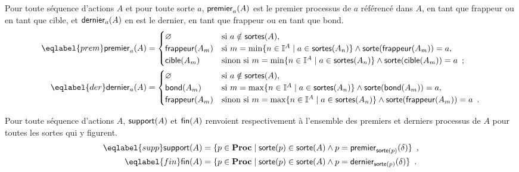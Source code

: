 \begin{definition}
  Pour toute séquence d'actions $A$ et pour toute sorte $a$,
  $\mathsf{premier}_{a}(A)$ est le premier processus de $a$ référencé dans $A$,
  en tant que frappeur ou en tant que cible,
  et $\mathsf{dernier}_{a}(A)$ en est le dernier,
  en tant que frappeur ou en tant que bond.
  \begin{align}
  \eqlabel{prem}
    \prem{a}{A} &=
      \begin{cases}
        \varnothing & \text{si } a \notin \sortes{A}, \\
        \hitter{A_m} & \text{si } m = \min\{ n \in \indexes{A} \mid a \in \sortes{A_n} \}
          \wedge \sorte{\hitter{A_m}} = a, \\
        \target{A_m} & \text{sinon si } m = \min\{ n \in \indexes{A} \mid a \in \sortes{A_n} \}
          \wedge \sorte{\target{A_m}} = a \enspace;
      \end{cases} \\
  \eqlabel{der}
    \der{a}{A} &=
      \begin{cases}
        \varnothing & \text{si } a \notin \sortes{A}, \\
        \bounce{A_m} & \text{si } m = \max\{ n \in \indexes{A} \mid a \in \sortes{A_n} \}
          \wedge \sorte{\bounce{A_m}} = a, \\
        \hitter{A_m} & \text{sinon si } m = \max\{ n \in \indexes{A} \mid a \in \sortes{A_n} \}
          \wedge \sorte{\hitter{A_m}} = a \enspace.
      \end{cases}
  \end{align}

  Pour toute séquence d'actions $A$,
  $\mathsf{support}(A)$ et $\mathsf{fin}(A)$ renvoient respectivement à l'ensemble des premiers
  et derniers processus de $A$ pour toutes les sortes qui y figurent.
  \begin{align}
  \eqlabel{supp}
    \supp{A} &= \{ p \in \Proc \mid \sorte{p} \in \sorte{A} \wedge
      p = \prem{\sort{p}}{\delta} \} \enspace, \\
  \eqlabel{fin}
    \fin{A} &= \{ p \in \Proc \mid \sorte{p} \in \sorte{A} \wedge
      p = \der{\sort{p}}{\delta} \} \enspace.
  \end{align}
\end{definition}

